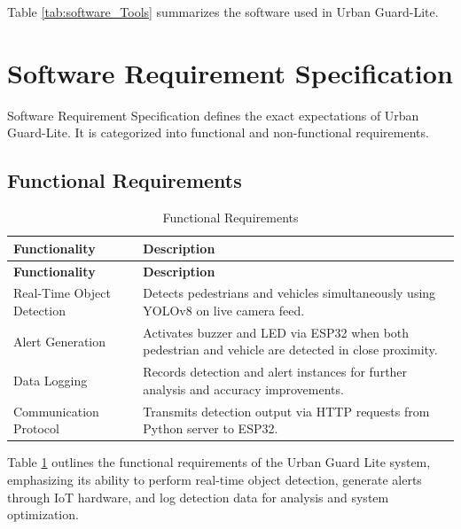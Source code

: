 \documentclass[a4paper, 12pt]{report}
\begin{document}
Table \ref{tab:software_Tools} summarizes the software used in Urban Guard-Lite.

\section{Software Requirement Specification}
Software Requirement Specification defines the exact expectations of Urban Guard-Lite. It is categorized into functional and non-functional requirements.

\subsection{Functional Requirements}
\begin{longtable}{|p{}|p{}|}
    \caption{Functional Requirements}\label{tab:functional_requirements} \\
    
    \hline
    \textbf{Functionality} & \textbf{Description} \\
    \hline
    \endfirsthead

    \hline
    \textbf{Functionality} & \textbf{Description} \\
    \hline
    \endhead

    \hline
    \endfoot

    \hline
    \endlastfoot

    Real-Time Object Detection & Detects pedestrians and vehicles simultaneously using YOLOv8 on live camera feed. \\
    \hline
    Alert Generation & Activates buzzer and LED via ESP32 when both pedestrian and vehicle are detected in close proximity. \\
    \hline
    Data Logging & Records detection and alert instances for further analysis and accuracy improvements. \\
    \hline
    Communication Protocol & Transmits detection output via HTTP requests from Python server to ESP32. \\
\end{longtable}

Table \ref{tab:functional_requirements} outlines the functional requirements of the Urban Guard Lite system, emphasizing its ability to perform real-time object detection, generate alerts through IoT hardware, and log detection data for analysis and system optimization.
\end{document}
